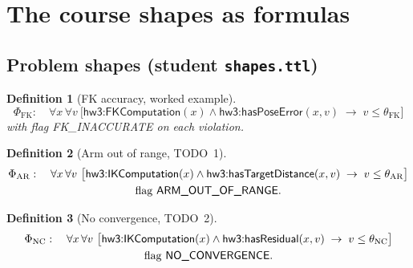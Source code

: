 \documentclass[11pt,a4paper]{article}
\newtheorem{definition}{Definition}[section]
\newcommand{\IRI}[1]{\textsf{#1}}                    %
\begin{document}
\section{The course shapes as formulas}\label{sec:formulas}

\subsection{Problem shapes (student \texttt{shapes.ttl})}

\begin{definition}[FK accuracy, worked example]
\[
  \Phi_{\mathrm{FK}}:\quad
  \forall x\,\forall v\ \bigl[\IRI{hw3{:}FKComputation}(x) \wedge
  \IRI{hw3{:}hasPoseError}(x,v) \;\rightarrow\; v \le \theta_{\mathrm{FK}}\bigr]
\]
with flag \textsf{FK\_INACCURATE} on each violation.
\end{definition}

\begin{definition}[Arm out of range, TODO~1]
\begin{gather*}
  \Phi_{\mathrm{AR}}:\quad
  \forall x\,\forall v\ \bigl[\IRI{hw3{:}IKComputation}(x) \wedge
  \IRI{hw3{:}hasTargetDistance}(x,v) \;\rightarrow\; v \le \theta_{\mathrm{AR}}\bigr] \\
  \text{flag \textsf{ARM\_OUT\_OF\_RANGE}}.
\end{gather*}
\end{definition}

\begin{definition}[No convergence, TODO~2]
\begin{gather*}
  \Phi_{\mathrm{NC}}:\quad
  \forall x\,\forall v\ \bigl[\IRI{hw3{:}IKComputation}(x) \wedge
  \IRI{hw3{:}hasResidual}(x,v) \;\rightarrow\; v \le \theta_{\mathrm{NC}}\bigr] \\
  \text{flag \textsf{NO\_CONVERGENCE}}.
\end{gather*}
\end{definition}
\end{document}
